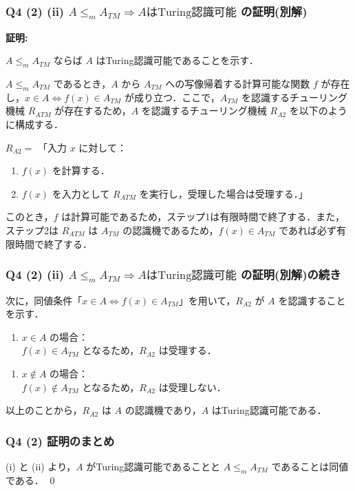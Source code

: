 \begin{frame}[fragile]
\frametitle{Q4 (2) \hspace{3mm} (ii) $A \le_{m} A_{TM} \Rightarrow A \text{はTuring認識可能}$ の証明(別解)}

\textbf{証明:}

$A \le_{m} A_{TM}$ ならば $A$ はTuring認識可能であることを示す．

$A \le_{m} A_{TM}$ であるとき，$A$ から $A_{TM}$ への写像帰着する計算可能な関数 $f$ が存在し，$x \in A \Leftrightarrow f(x) \in A_{TM}$ が成り立つ．ここで，$A_{TM}$ を認識するチューリング機械 $R_{ATM}$ が存在するため，$A$ を認識するチューリング機械 $R_{A2}$ を以下のように構成する．

$R_{A2} =$ 「入力 $x$ に対して：

\begin{enumerate}
    \item $f(x)$ を計算する．
    \item $f(x)$ を入力として $R_{ATM}$ を実行し，受理した場合は受理する．」
\end{enumerate}

このとき，$f$ は計算可能であるため，ステップ1は有限時間で終了する．また，ステップ2は $R_{ATM}$ は $A_{TM}$ の認識機であるため，$f(x) \in A_{TM}$ であれば必ず有限時間で終了する．

\end{frame}



\begin{frame}[fragile]
\frametitle{Q4 (2) \hspace{3mm} (ii) $A \le_{m} A_{TM} \Rightarrow A \text{はTuring認識可能}$ の証明(別解)の続き}

次に，同値条件「$x \in A \Leftrightarrow f(x) \in A_{TM}$」を用いて，$R_{A2}$ が $A$ を認識することを示す．

\begin{enumerate}
  \item[・] $x \in A$ の場合： \\
  $f(x) \in A_{TM}$ となるため，$R_{A2}$ は受理する．
\end{enumerate}

\begin{enumerate}
  \item[・] $x \notin A$ の場合： \\
  $f(x) \notin A_{TM}$ となるため，$R_{A2}$ は受理しない．
\end{enumerate}

以上のことから，$R_{A2}$ は $A$ の認識機であり，$A$ はTuring認識可能である．

\end{frame}



\begin{frame}[fragile]
\frametitle{Q4 (2) 証明のまとめ}

(i) と (ii) より，$A$ がTuring認識可能であることと $A \le_{m} A_{TM}$ であることは同値である．
\hfill \qed

\end{frame}